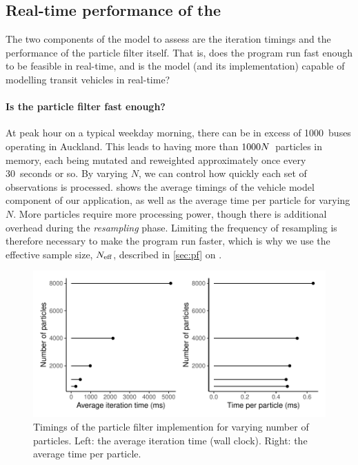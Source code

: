 \subsection{Real-time performance of the \pf{}}
\label{sec:pf_issues}



The two components of the model to assess are the iteration timings and the performance of the particle filter itself. That is, does the program run fast enough to be feasible in real-time, and is the model (and its \pf{} implementation) capable of modelling transit vehicles in real-time?


\paragraph{Is the particle filter fast enough?}
At peak hour on a typical weekday morning, there can be in excess of 1000~buses operating in Auckland. This leads to having more than $1000N$~particles in memory, each being mutated and reweighted approximately once every 30~seconds or so. By varying $N$, we can control how quickly each set of observations is processed.  shows the average timings of the vehicle model component of our application, as well as the average time per particle for varying $N$. More particles require more processing power, though there is additional overhead during the \emph{resampling} phase. Limiting the frequency of resampling is therefore necessary to make the program run faster, which is why we use the effective sample size, $N_\text{eff}$, described in \cref{sec:pf} on .


\begin{knitrout}\small
{}\color{fgcolor}\begin{figure}

{\centering \includegraphics[width=.8\textwidth]{figure/pf_timings-1} 

}

\caption[Timings of the particle filter implemention for varying number of particles]{Timings of the particle filter implemention for varying number of particles. Left: the average iteration time (wall clock). Right: the average time per particle.}\label{fig:pf_timings}
\end{figure}


\end{knitrout}


